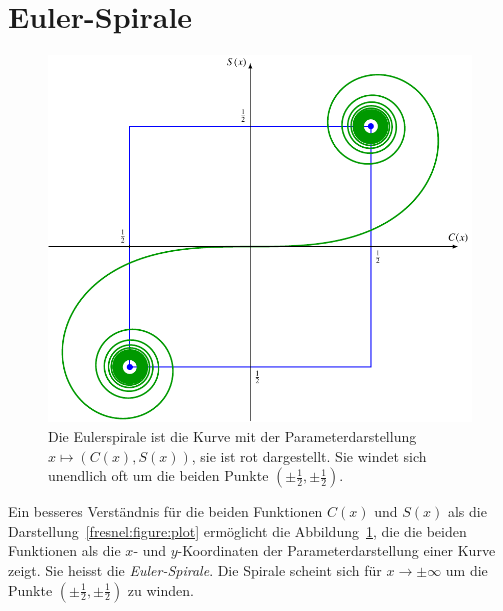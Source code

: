 %
%
%
\section{Euler-Spirale
\label{fresnel:section:eulerspirale}}
\begin{figure}
\centering
\includegraphics{papers/fresnel/images/eulerspirale.pdf}
\caption{Die Eulerspirale ist die Kurve mit der Parameterdarstellung
$x\mapsto (C(x),S(x))$, sie ist rot dargestellt.
Sie windet sich unendlich oft um die beiden Punkte $(\pm\frac12,\pm\frac12)$.
\label{fresnel:figure:eulerspirale}}
\end{figure}
Ein besseres Verständnis für die beiden Funktionen $C(x)$ und $S(x)$
als die Darstellung~\ref{fresnel:figure:plot} ermöglicht die
Abbildung~\ref{fresnel:figure:eulerspirale}, die die beiden Funktionen
als die $x$- und $y$-Koordinaten der Parameterdarstellung einer Kurve
zeigt.
Sie heisst die {\em Euler-Spirale}.
Die Spirale scheint sich für $x\to\pm\infty$ um die Punkte
$(\pm\frac12,\pm\frac12)$ zu winden.


